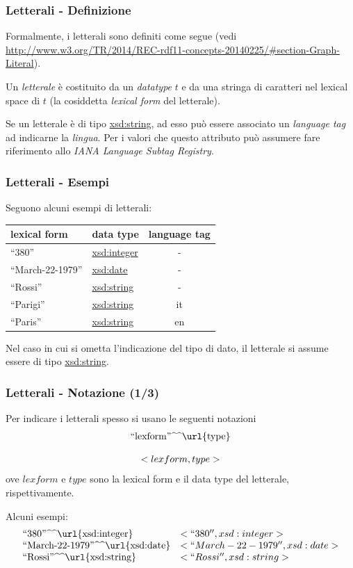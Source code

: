 \documentclass[8pt]{beamer}
\newcommand{\literal}[2]{\mbox{``#1''\textasciicircum\textasciicircum\url{#2}}} %
\begin{document}
\begin{frame}
  \frametitle{Letterali - Definizione}
  Formalmente, i letterali sono definiti come segue (vedi 
  \url{http://www.w3.org/TR/2014/REC-rdf11-concepts-20140225/\#section-Graph-Literal}).
  \vspace{\baselineskip}

  Un \emph{letterale} \`e costituito da un \emph{datatype} $t$ e da una 
  stringa di caratteri nel lexical space di $t$ (la cosiddetta \emph{lexical form}
  del letterale).
  \vspace{\baselineskip}

  Se un letterale \`e di tipo \url{xsd:string}, ad esso pu\`o essere associato un
  \emph{language tag} ad indicarne la \emph{lingua}. Per i valori che questo attributo pu\`o
  assumere fare riferimento allo \emph{IANA Language Subtag Registry}.
\end{frame}

\begin{frame}
\frametitle{Letterali - Esempi}
  Seguono alcuni esempi di letterali:

  \begin{center}
  \begin{tabular}{|l|l|c|}
    \hline
    \textbf{lexical form} & \textbf{data type} & \textbf{language tag}\\
    \hline
    ``380'' & \url{xsd:integer} & - \\
    ``March-22-1979'' & \url{xsd:date} & - \\
    ``Rossi'' & \url{xsd:string} & - \\
    ``Parigi'' & \url{xsd:string} & it \\
    ``Paris'' & \url{xsd:string} & en\\
    \hline
  \end{tabular}
  \end{center}
  \vspace{\baselineskip}

  Nel caso in cui si ometta l'indicazione del tipo di dato, il letterale si assume essere
  di tipo \url{xsd:string}.
\end{frame}


\begin{frame}
  \frametitle{Letterali - Notazione (1/3)}
  Per indicare i letterali spesso si usano le seguenti notazioni
  \[
  \begin{array}{c}
    \literal{lexform}{type} \\
    \\
    < lexform, type >
  \end{array}
  \]
  ove $lexform$ e $type$ sono la lexical form e il data type del letterale, rispettivamente.
  \vspace{\baselineskip}

  Alcuni esempi:
  \[
  \begin{array}{ll}
    \literal{380}{xsd:integer} & <``380'', xsd:integer>\\
    \literal{March-22-1979}{xsd:date} & <``March-22-1979'', xsd:date>\\
    \literal{Rossi}{xsd:string} & <``Rossi'', xsd:string>
  \end{array}
  \]
\end{frame}
\end{document}
